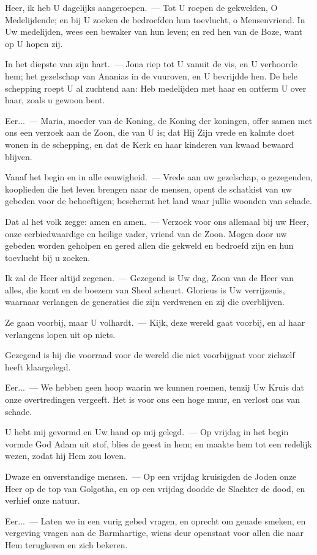\documentclass[12pt,twoside,a5paper]{article}
\begin{document}
\begin{halfparskip}
   Heer, ik heb U dagelijks aangeroepen.~--- Tot U roepen de gekwelden, O Medelijdende; en bij U zoeken de bedroefden hun toevlucht, o Mensenvriend. In Uw medelijden, wees een bewaker van hun leven; en red hen van de Boze, want op U hopen zij.

  In het diepste van zijn hart.~--- Jona riep tot U vanuit de vis, en U verhoorde hem; het gezelschap van Ananias in de vuuroven, en U bevrijdde hen. De hele schepping roept U al zuchtend aan: Heb medelijden met haar en ontferm U over haar, zoals u gewoon bent.

  Eer...~--- Maria, moeder van de Koning, de Koning der koningen, offer samen met ons een verzoek aan de Zoon, die van U is; dat Hij Zijn vrede en kalmte doet wonen in de schepping, en dat de Kerk en haar kinderen van kwaad bewaard blijven.

  Vanaf het begin en in alle eeuwigheid.~--- Vrede aan uw gezelschap, o gezegenden, kooplieden die het leven brengen naar de mensen, opent de schatkist van uw gebeden voor de behoeftigen; beschermt het land waar jullie woonden van schade.

  Dat al het volk zegge: amen en amen.~--- Verzoek voor ons allemaal bij uw Heer, onze eerbiedwaardige en heilige vader, vriend van de Zoon. Mogen door uw gebeden worden geholpen en gered allen die gekweld en bedroefd zijn en hun toevlucht bij u zoeken.
\end{halfparskip}

\begin{halfparskip}
   Ik zal de Heer altijd zegenen.~--- Gezegend is Uw dag, Zoon van de Heer van alles, die komt en de boezem van Sheol scheurt. Glorieus is Uw verrijzenis, waarnaar verlangen de generaties die zijn verdwenen en zij die overblijven.

  Ze gaan voorbij, maar U volhardt.~--- Kijk, deze wereld gaat voorbij, en al haar verlangens lopen uit op niets.

  Gezegend is hij die voorraad voor de wereld die niet voorbijgaat voor zichzelf heeft klaargelegd.

  Eer...~--- We hebben geen hoop waarin we kunnen roemen, tenzij Uw Kruis dat onze overtredingen vergeeft. Het is voor ons een hoge muur, en verlost ons van schade.
\end{halfparskip}

\begin{halfparskip}
   U hebt mij gevormd en Uw hand op mij gelegd.~--- Op vrijdag in het begin vormde God Adam uit stof, blies de geest in hem; en maakte hem tot een redelijk wezen, zodat hij Hem zou loven.

  Dwaze en onverstandige mensen.~--- Op een vrijdag kruisigden de Joden onze Heer op de top van Golgotha, en op een vrijdag doodde de Slachter de dood, en verhief onze natuur.

  Eer...~--- Laten we in een vurig gebed vragen, en oprecht om genade smeken, en vergeving vragen aan de Barmhartige, wiens deur openstaat voor allen die naar Hem terugkeren en zich bekeren.
\end{halfparskip}
\end{document}
